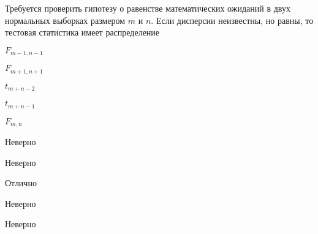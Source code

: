 
\begin{question}
Требуется проверить гипотезу о равенстве математических ожиданий в двух
нормальных выборках размером \(m\) и \(n\). Если дисперсии неизвестны,
но равны, то тестовая статистика имеет распределение
\begin{answerlist}
  \item \(F_{m-1,n-1}\)
  \item \(F_{m+1,n+1}\)
  \item \(t_{m+n-2}\)
  \item \(t_{m+n-1}\)
  \item \(F_{m,n}\)
\end{answerlist}
\end{question}

\begin{solution}
\begin{answerlist}
  \item Неверно
  \item Неверно
  \item Отлично
  \item Неверно
  \item Неверно
\end{answerlist}
\end{solution}

